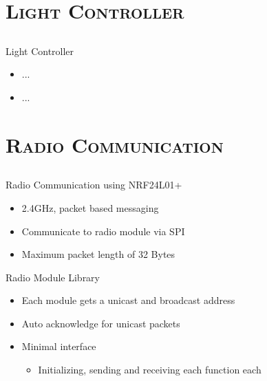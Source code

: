 	
	\section{\scshape Light Controller}
	\subsection{}
	\begin{frame}{Light Controller}
		\begin{itemize}
			\item ...
			\item ...
		\end{itemize}
		
	\end{frame}


	\section{\scshape Radio Communication}
	\subsection{}
	\begin{frame}{Radio Communication using NRF24L01+}
		\begin{itemize}
			\item 2.4GHz, packet based messaging
			\item Communicate to radio module via SPI
			\item Maximum packet length of 32 Bytes
		\end{itemize}
	\end{frame}
	
	\begin{frame}{Radio Module Library}
		\begin{itemize}
			\item Each module gets a unicast and broadcast address
			\item Auto acknowledge for unicast packets
			\item Minimal interface
			\begin{itemize}
				\item Initializing, sending and receiving each function each
			\end{itemize}
		\end{itemize}
	\end{frame}
	

